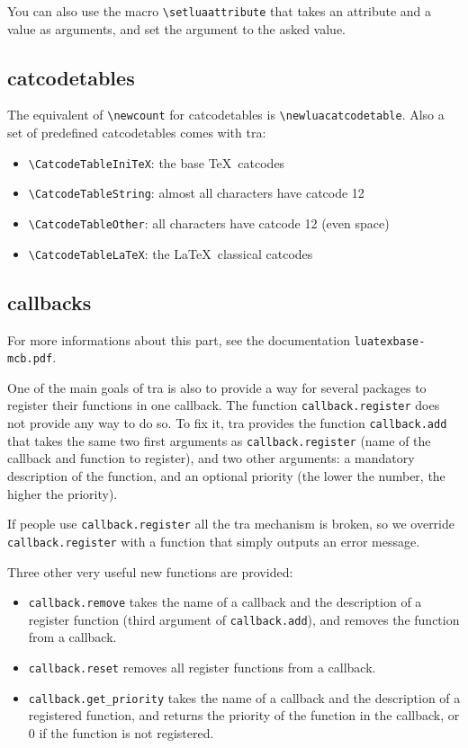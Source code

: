 \documentclass{article}
\newcommand\code{\texttt}
\begin{document}
You can also use the macro \verb+\setluaattribute+ that takes an
attribute and a value as arguments, and set the argument to the asked value.

\subsection{catcodetables}

The equivalent of \verb+\newcount+ for catcodetables is
\verb+\newluacatcodetable+. Also a set of predefined catcodetables
comes with \LuaTeX tra:

\begin{itemize}
  \item \verb+\CatcodeTableIniTeX+: the base \TeX\ catcodes
  \item \verb+\CatcodeTableString+: almost all characters have
    catcode 12
  \item \verb+\CatcodeTableOther+: all characters have catcode 12
    (even space)
  \item \verb+\CatcodeTableLaTeX+: the \LaTeX\ classical catcodes
\end{itemize}

\subsection{callbacks}

For more informations about this part, see the documentation
\code{luatexbase-mcb.pdf}.

One of the main goals of \LuaTeX tra is also to provide a way for several
packages to register their functions in one callback. The function
\code{callback.register} does not provide any way to do so. To fix it,
\LuaTeX tra provides the function \code{callback.add} that takes the same
two first arguments as \code{callback.register} (name of the callback and
function to register), and two other arguments: a mandatory description of the
function, and an optional priority (the lower the number, the higher the
priority).

If people use \code{callback.register} all the \LuaTeX tra mechanism is
broken, so we override \code{callback.register} with a function that simply
outputs an error message.

Three other very useful new functions are provided:

\begin{itemize}
  \item \code{callback.remove} takes the name of a callback and the
    description of a register function (third argument of
    \code{callback.add}), and removes the function from a callback.
  \item \code{callback.reset} removes all register functions from a
    callback.
  \item \code{callback.get\_priority} takes the name of a callback and the
    description of a registered function, and returns the priority of the
    function in the callback, or 0 if the function is not registered.
\end{itemize}
\end{document}
